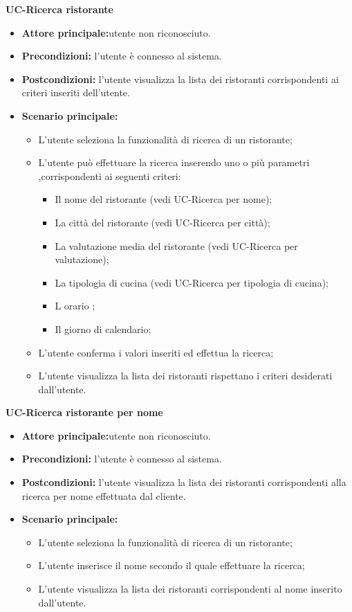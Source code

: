 \textbf{UC-Ricerca ristorante}
\begin{itemize}
\item \textbf{Attore principale:}utente non riconosciuto.
\item \textbf{Precondizioni:} l'utente è connesso al sistema.
\item \textbf{Postcondizioni:} l'utente visualizza la lista dei ristoranti corrispondenti ai criteri inseriti
dell'utente.
\item \textbf{Scenario principale:}
\begin{itemize}
    \item L'utente seleziona la funzionalità di ricerca di un ristorante;
    \item L'utente può effettuare la ricerca inserendo uno o più parametri ,corrispondenti
    ai seguenti criteri:
    \begin{itemize}
        \item Il nome del ristorante (vedi UC-Ricerca per nome);
        \item La città del ristorante (vedi UC-Ricerca per città);
        \item La valutazione media del ristorante (vedi UC-Ricerca per valutazione);
        \item La tipologia di cucina (vedi UC-Ricerca per tipologia di cucina);
        \item L orario ;
        \item Il giorno di calendario; 
    \end{itemize}
    \item L'utente conferma i valori inseriti ed effettua la ricerca;
    \item L'utente visualizza la lista dei ristoranti rispettano i criteri desiderati dall'utente.
\end{itemize}
\end{itemize}

\textbf{UC-Ricerca ristorante per nome}
\begin{itemize}
\item \textbf{Attore principale:}utente non riconosciuto.
\item \textbf{Precondizioni:} l'utente è connesso al sistema.
\item \textbf{Postcondizioni:} l'utente visualizza la lista dei ristoranti corrispondenti 
alla ricerca per nome effettuata dal cliente.
\item \textbf{Scenario principale:}
\begin{itemize}
    \item L'utente seleziona la funzionalità di ricerca di un ristorante;
    \item L'utente inserisce il nome secondo il quale effettuare la ricerca;
    \item L'utente visualizza la lista dei ristoranti corrispondenti al nome inserito dall'utente.
\end{itemize}
\end{itemize}


